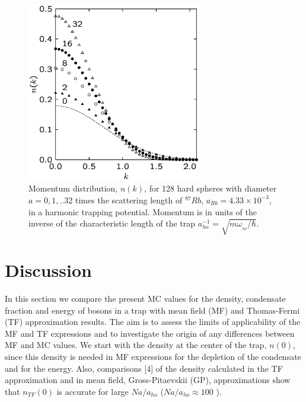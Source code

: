 \documentclass[aps,pra,twocolumn,groupedaddress]{revtex4}
\begin{document}
    \begin{figure}
\begin{center}
\includegraphics[width=3in]{fig9.ps}
 \caption{\footnotesize
Momentum distribution, $n(k)$, for 128 hard spheres with diameter $a = 0,1,..32$
times the scattering length of $^{87}Rb$, $a_{Rb} = 4.33 \times 10^{-3}$, in a
harmonic trapping potential.  Momentum is in units of the inverse of
the characteristic length of the trap $a^{-1}_{ho} = \sqrt{{m \omega_{_{ho}}}/{\hbar}}$.
        }
\end{center}
    \end{figure}
\section{Discussion}
In this section we compare the present MC values for the density, condensate
fraction and energy of bosons in a trap with mean field (MF) and Thomas-Fermi
(TF) approximation results.  The aim is to assess the limits of
applicability of the MF and TF expressions and to investigate the origin of any
differences between MF and MC values.  
We start with the density at the center of the
trap, $n(0)$, since this density is needed in MF expressions for the 
depletion of
the condensate and for the energy. 
Also, comparisons [4] of the density calculated in the TF
approximation and in mean field, Gross-Pitaevskii (GP), approximations show that
$n_{TF}(0)$ is accurate for large $Na/a_{ho}$ ($Na/a_{ho} \approx 100$ ).
\end{document}
